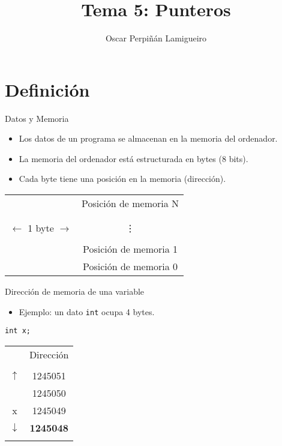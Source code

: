 \documentclass[xcolor={usenames,svgnames,dvipsnames}, aspectratio=169]{beamer}
\author{Oscar Perpiñán Lamigueiro}
\date{}
\title{Tema 5: Punteros}
\begin{document}
\maketitle

\section{Definición}
\label{sec:orga485964}

\begin{frame}[label={sec:org35a2e3c}]{Datos y Memoria}
\begin{itemize}
\item Los datos de un programa se almacenan en la memoria del ordenador.

\item La memoria del ordenador está estructurada en \alert{bytes} (8 bits).

\item Cada byte tiene una posición en la memoria (dirección).
\end{itemize}

\begin{center}
  \begin{tabular}{ | c | c}
    \cline{1-1}
     & Posición de memoria N \\ \cline{1-1}
     & \\ \cline{1-1}
     & \\ \cline{1-1}
    $\leftarrow$  1 byte $\rightarrow$ & \vdots \\ \cline{1-1}
     & \\ \cline{1-1}
     & Posición de memoria 1 \\ \cline{1-1}
     & Posición de memoria 0 \\ \cline{1-1}
  \end{tabular}
\end{center}
\end{frame}

\begin{frame}[label={sec:orgc3678ec},fragile]{Dirección de memoria de una variable}
 \begin{itemize}
\item Ejemplo: un dato \texttt{int} ocupa 4 bytes.
\end{itemize}
\lstset{language=C,label= ,caption= ,captionpos=b,numbers=none}
\begin{lstlisting}
int x;
\end{lstlisting}

\begin{center}
  \begin{tabular}{ | c | c}
    \cline{1-1}
     & Dirección\\ \cline{1-1}
     & \\ \hline
     $\uparrow$ & 1245051\\ \cline{1-1}
     & 1245050 \\ \cline{1-1}
     x     & 1245049\\ \cline{1-1}
     $\downarrow$     & \textbf{1245048} \\ \hline
     & \\ \cline{1-1}
  \end{tabular}
\end{center}
\end{frame}
\end{document}
